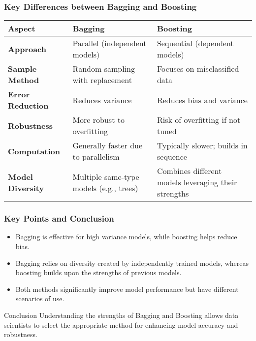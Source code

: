 \documentclass[aspectratio=169]{beamer}
\begin{document}
\begin{frame}[fragile]
    \frametitle{Key Differences between Bagging and Boosting}
    \begin{table}[]
        \begin{tabular}{|l|l|l|}
            \hline
            \textbf{Aspect}           & \textbf{Bagging}                      & \textbf{Boosting}                   \\ \hline
            \textbf{Approach}        & Parallel (independent models)          & Sequential (dependent models)       \\ \hline
            \textbf{Sample Method}   & Random sampling with replacement        & Focuses on misclassified data       \\ \hline
            \textbf{Error Reduction}  & Reduces variance                       & Reduces bias and variance           \\ \hline
            \textbf{Robustness}      & More robust to overfitting             & Risk of overfitting if not tuned    \\ \hline
            \textbf{Computation}     & Generally faster due to parallelism     & Typically slower; builds in sequence \\ \hline
            \textbf{Model Diversity} & Multiple same-type models (e.g., trees)  & Combines different models leveraging their strengths \\ \hline
        \end{tabular}
    \end{table}
\end{frame}

\begin{frame}[fragile]
    \frametitle{Key Points and Conclusion}
    \begin{itemize}
        \item Bagging is effective for high variance models, while boosting helps reduce bias.
        \item Bagging relies on diversity created by independently trained models, whereas boosting builds upon the strengths of previous models.
        \item Both methods significantly improve model performance but have different scenarios of use.
    \end{itemize}
    \begin{block}{Conclusion}
        Understanding the strengths of Bagging and Boosting allows data scientists to select the appropriate method for enhancing model accuracy and robustness.
    \end{block}
\end{frame}
\end{document}
